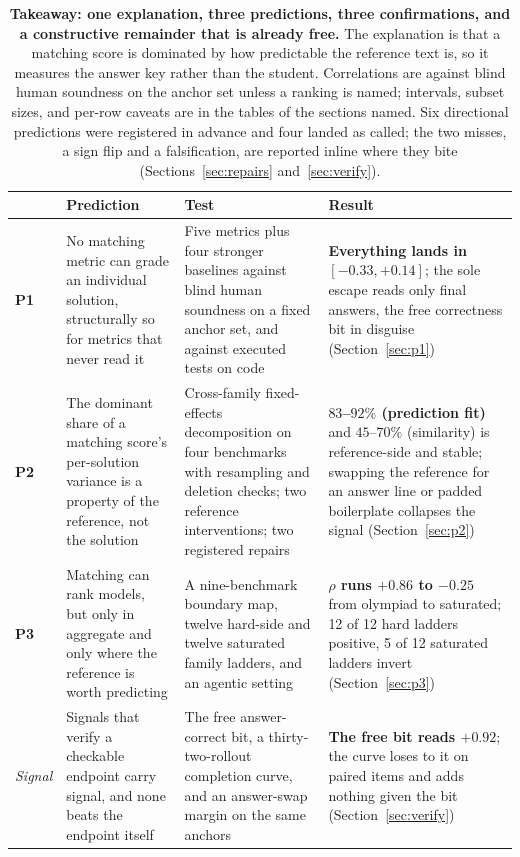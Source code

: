 \documentclass[11pt]{article}
\begin{document}
\begin{table}[t!]
\centering
\small
\setlength{\tabcolsep}{5pt}
\begin{tabular}{L{1.1cm}L{4.6cm}L{4.2cm}L{4.0cm}}
\toprule
& Prediction & Test & Result \\
\midrule
\textbf{P1} & No matching metric can grade an individual solution, structurally so for metrics that never read it &
Five metrics plus four stronger baselines against blind human soundness on a fixed anchor set, and against executed tests on code &
\textbf{Everything lands in $[-0.33, +0.14]$}; the sole escape reads only final answers, the free correctness bit in disguise (Section~\ref{sec:p1}) \\
\addlinespace[3pt]
\textbf{P2} & The dominant share of a matching score's per-solution variance is a property of the reference, not the solution &
Cross-family fixed-effects decomposition on four benchmarks with resampling and deletion checks; two reference interventions; two registered repairs &
\textbf{$83$--$92\%$ (prediction fit)} and $45$--$70\%$ (similarity) is reference-side and stable; swapping the reference for an answer line or padded boilerplate collapses the signal (Section~\ref{sec:p2}) \\
\addlinespace[3pt]
\textbf{P3} & Matching can rank models, but only in aggregate and only where the reference is worth predicting &
A nine-benchmark boundary map, twelve hard-side and twelve saturated family ladders, and an agentic setting &
\textbf{$\rho$ runs $+0.86$ to $-0.25$} from olympiad to saturated; 12 of 12 hard ladders positive, 5 of 12 saturated ladders invert (Section~\ref{sec:p3}) \\
\midrule
\emph{Signal} & Signals that verify a checkable endpoint carry signal, and none beats the endpoint itself &
The free answer-correct bit, a thirty-two-rollout completion curve, and an answer-swap margin on the same anchors &
\textbf{The free bit reads $+0.92$}; the curve loses to it on paired items and adds nothing given the bit (Section~\ref{sec:verify}) \\
\bottomrule
\end{tabular}
\caption{\textbf{Takeaway: one explanation, three predictions, three confirmations, and a constructive remainder that is already free.} The explanation is that a matching score is dominated by how predictable the reference text is, so it measures the answer key rather than the student. Correlations are against blind human soundness on the anchor set unless a ranking is named; intervals, subset sizes, and per-row caveats are in the tables of the sections named. Six directional predictions were registered in advance and four landed as called; the two misses, a sign flip and a falsification, are reported inline where they bite (Sections~\ref{sec:repairs} and~\ref{sec:verify}).}
\label{tab:predictions}
\end{table}
\end{document}
